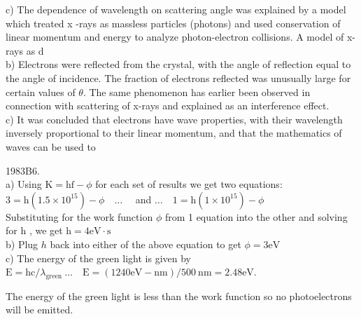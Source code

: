\begin{enumerate}
c) The dependence of wavelength on scattering angle was explained by a model which treated x -rays as massless particles (photons) and used conservation of linear momentum and energy to analyze photon-electron collisions. A model of x-rays as d\\
b) Electrons were reflected from the crystal, with the angle of reflection equal to the angle of incidence. The fraction of electrons reflected was unusually large for certain values of $\theta$. The same phenomenon has earlier been observed in connection with scattering of x-rays and explained as an interference effect.\\
c) It was concluded that electrons have wave properties, with their wavelength inversely proportional to their linear momentum, and that the mathematics of waves can be used to

1983B6.\\
a) Using $\mathrm{K}=\mathrm{hf}-\phi$ for each set of results we get two equations:\\
$3=\mathrm{h}\left(1.5 \times 10^{15}\right)-\phi \quad \ldots \quad$ and $\ldots \quad 1=\mathrm{h}\left(1 \times 10^{15}\right)-\phi$\\
Substituting for the work function $\phi$ from 1 equation into the other and solving for h , we get $\mathrm{h}=4 \mathrm{eV} \cdot \mathrm{s}$\\
b) Plug $h$ back into either of the above equation to get $\phi=3 \mathrm{eV}$\\
c) The energy of the green light is given by $\mathrm{E}=\mathrm{hc} / \lambda_{\text {green }} \ldots \quad \mathrm{E}=(1240 \mathrm{eV}-\mathrm{nm}) / 500 \mathrm{~nm}=2.48 \mathrm{eV}$.

The energy of the green light is less than the work function so no photoelectrons will be emitted.


\end{enumerate}
